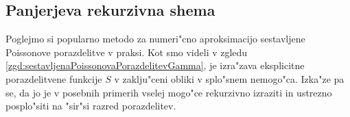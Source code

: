 \documentclass[12pt, a4paper, reqno]{amsart}
\theoremstyle{definition}
\theoremstyle{plain}
\newcommand{\1}{\mathds{1}}
\begin{document}
%
%





    \subsection{Panjerjeva rekurzivna shema}
    Poglejmo si popularno metodo za numeri"cno aproksimacijo sestavljene Poissonove porazdelitve v praksi. Kot
    smo videli v zgledu \ref{zgd:sestavljenaPoissonovaPorazdelitevGamma}, je izra"zava eksplicitne 
    porazdelitvene funkcije $S$ v zaklju"ceni obliki v splo"snem nemogo"ca. Izka"ze pa se, da jo je v posebnih primerih vselej mogo"ce
    rekurzivno izraziti in ustrezno posplo"siti na "sir"si razred porazdelitev. 
\end{document}
